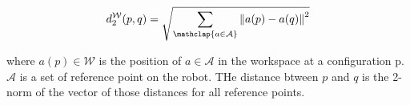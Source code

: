 
\begin{equation}\label{eq:metric}
d^{\mathcal{W}}_2(p,q) = \sqrt{\sum_{\mathclap{a \in \mathcal{A}}} {\Vert a(p) - a(q) \Vert}^2}
\end{equation}	

where $a(p) \in \mathcal{W}$ is the position of $a \in \mathcal{A}$
in the workspace at a configuration p. $\mathcal{A}$ is a set
of reference point on the robot. THe distance btween $p$ and
$q$ is the 2-norm of the vector of those distances for all reference
points.
